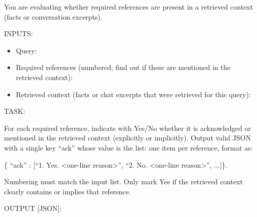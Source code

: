 \begin{promptbox}
You are evaluating whether required references are present in a retrieved context (facts or conversation excerpts).

INPUTS:
\begin{itemize}
  \item Query: 
  \item Required references (numbered; find out if these are mentioned in the retrieved context): 
  \item Retrieved context (facts or chat excerpts that were retrieved for this query): 
\end{itemize}

TASK:

For each required reference, indicate with Yes/No whether it is acknowledged or mentioned in the retrieved context (explicitly or implicitly).  
Output valid JSON with a single key ``ack'' whose value is the list: one item per reference, format as: 

\{ ``ack'' : [``1. Yes. <one-line reason>'', ``2. No. <one-line reason>'', ...]\}.

\vspace{1em}
Numbering must match the input list. Only mark Yes if the retrieved context clearly contains or implies that reference.

OUTPUT [JSON]:
\end{promptbox}

